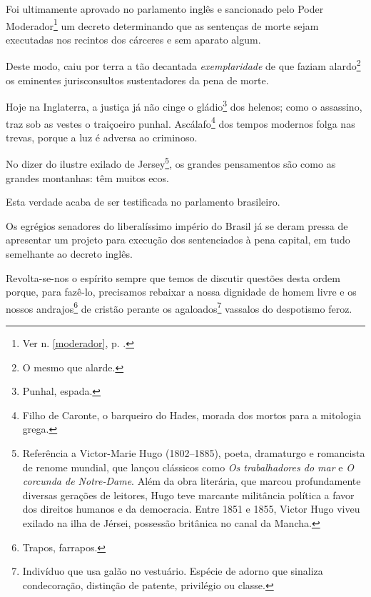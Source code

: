 



Foi ultimamente aprovado no parlamento inglês e sancionado pelo Poder
Moderador\footnote{Ver n. \ref{moderador}, p. \pageref{moderador}.} 
um decreto determinando que as sentenças de morte sejam executadas nos 
recintos dos cárceres e sem aparato algum.

Deste modo, caiu por terra a tão decantada \emph{exemplaridade} de que
faziam alardo\footnote{O mesmo que alarde.} os eminentes
jurisconsultos sustentadores da pena de morte.

Hoje na Inglaterra, a justiça já não cinge o gládio\footnote{Punhal,
  espada.} dos helenos; como o assassino, traz sob as vestes o
traiçoeiro punhal. Ascálafo\footnote{Filho de Caronte, o barqueiro do
  Hades, morada dos mortos para a mitologia grega.} dos tempos modernos
folga nas trevas, porque a luz é adversa ao criminoso.

No dizer do ilustre exilado de Jersey\footnote{Referência a
  Victor-Marie Hugo (1802--1885), poeta, dramaturgo e romancista de
  renome mundial, que lançou clássicos como \emph{Os trabalhadores do
  mar} e \emph{O corcunda de Notre-Dame}. Além da obra literária, que
  marcou profundamente diversas gerações de leitores, Hugo teve marcante
  militância política a favor dos direitos humanos e da democracia.
  Entre 1851 e 1855, Victor Hugo viveu exilado na ilha de Jérsei,
  possessão britânica no canal da Mancha.}, os grandes pensamentos são
como as grandes montanhas: têm muitos ecos.

Esta verdade acaba de ser testificada no parlamento brasileiro.

Os egrégios senadores do liberalíssimo império do Brasil já se deram
pressa de apresentar um projeto para execução dos sentenciados à pena
capital, em tudo semelhante ao decreto inglês.

Revolta-se-nos o espírito sempre que temos de discutir questões desta
ordem porque, para fazê-lo, precisamos rebaixar a nossa dignidade de
homem livre e os nossos andrajos\footnote{Trapos, farrapos.} de
cristão perante os agaloados\footnote{Indivíduo que usa galão no
  vestuário. Espécie de adorno que sinaliza condecoração, distinção de
  patente, privilégio ou classe.} vassalos do despotismo feroz.

